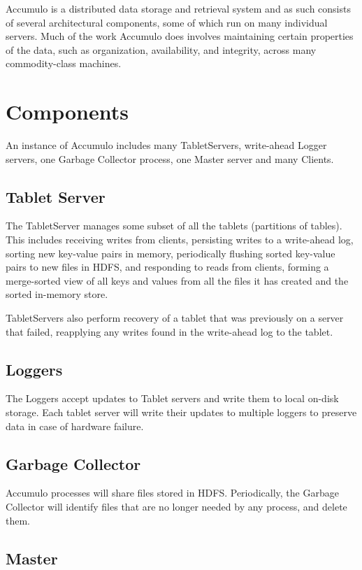 Accumulo is a distributed data storage and retrieval system and as such consists of
several architectural components, some of which run on many individual servers.
Much of the work Accumulo does involves maintaining certain properties of the
data, such as organization, availability, and integrity, across many commodity-class
machines.

\section{Components}

An instance of Accumulo includes many TabletServers, write-ahead Logger
servers, one Garbage Collector process, one Master server and many Clients.

\subsection{Tablet Server}

The TabletServer manages some subset of all the tablets (partitions of tables). This includes receiving writes from clients, persisting writes to a
write-ahead log, sorting new key-value pairs in memory, periodically
flushing sorted key-value pairs to new files in HDFS, and responding
to reads from clients, forming a merge-sorted view of all keys and
values from all the files it has created and the sorted in-memory
store.

TabletServers also perform recovery of a tablet
that was previously on a server that failed, reapplying any writes
found in the write-ahead log to the tablet.

\subsection{Loggers}

The Loggers accept updates to Tablet servers and write them to local
on-disk storage.  Each tablet server will write their updates to
multiple loggers to preserve data in case of hardware failure.

\subsection{Garbage Collector}

Accumulo processes will share files stored in HDFS.  Periodically, the Garbage
Collector will identify files that are no longer needed by any process, and
delete them.

\subsection{Master}

